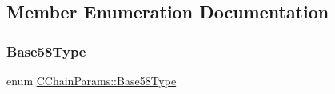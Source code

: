 \subsection{Member Enumeration Documentation}
\mbox{\label{class_c_chain_params_aa294058ec2e3586bd8d03d6c39667058}} 
\subsubsection{\texorpdfstring{Base58\+Type}{Base58Type}}
{\footnotesize\ttfamily enum \mbox{\hyperlink{class_c_chain_params_aa294058ec2e3586bd8d03d6c39667058}{C\+Chain\+Params\+::\+Base58\+Type}}}

